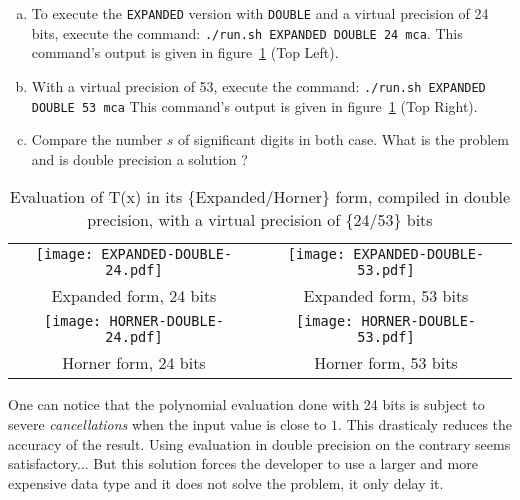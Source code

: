 \begin{question}
\begin{enumerate}[(a)]
\item To execute the {\tt EXPANDED} version with {\tt DOUBLE} and a virtual precision of 24 bits, execute the command: {\tt ./run.sh EXPANDED
      DOUBLE 24 mca}. \newline This command's output is given in figure~\ref{fig:exp_hor_24_53} (Top Left).
  \item With a virtual precision of 53, execute the command: {\tt ./run.sh EXPANDED DOUBLE 53 mca} \newline
  This command's output is given in figure~\ref{fig:exp_hor_24_53} (Top Right).
  \item Compare the number $s$ of significant digits in both case. What is the problem and is double precision a solution ?  
  \end{enumerate}
\end{question}

\begin{table}
\begin{tabular}{cc}
\texttt{[image: EXPANDED-DOUBLE-24.pdf]} &
\texttt{[image: EXPANDED-DOUBLE-53.pdf]} \\
Expanded form, 24 bits & Expanded form, 53 bits \\ 
\texttt{[image: HORNER-DOUBLE-24.pdf]} &
\texttt{[image: HORNER-DOUBLE-53.pdf]} \\
Horner form, 24 bits & Horner form, 53 bits \\
\end{tabular}
  \caption{Evaluation of T(x) in its \{Expanded/Horner\} form, compiled in double precision, with a virtual precision of \{24/53\} bits}
  \label{fig:exp_hor_24_53}
\end{table}


One can notice that the polynomial evaluation done with 24 bits is subject to severe {\it cancellations} when the input value is close to $1$.
This drasticaly reduces the accuracy of the result. 
Using evaluation in double precision on the contrary seems satisfactory...
But this solution forces the developer to use a larger and more expensive data type and it does not solve the problem, it only delay it. 

